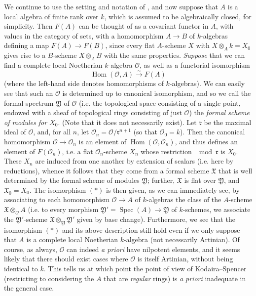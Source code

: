 We continue to use the setting and notation of , and now suppose that $A$ is a local algebra of finite rank over $k$, which is assumed to be algebraically closed, for simplicity.
Then $F(A)$ can be thought of as a covariant functor in $A$, with values in the category of sets, with a homomorphism $A\to B$ of $k$-algebras defining a map $F(A)\to F(B)$, since every flat $A$-scheme $X$ with $X\otimes_Ak=X_0$ gives rise to a $B$-scheme $X\otimes_AB$ with the same properties.
\emph{Suppose} that we can find a complete local Noetherian $k$-algebra $\mathcal{O}$, as well as a functorial isomorphism
\[
    \operatorname{Hom}(\mathcal{O},A) \xrightarrow{\sim} F(A)\tag{*}
\]
(where the left-hand side denotes homomorphisms of $k$-algebras).
We can easily see that such an $\mathcal{O}$ is determined up to canonical isomorphism, and so we call the formal spectrum $\mathfrak{Y}$ of $\mathcal{O}$ (i.e. the topological space consisting of a single point, endowed with a sheaf of topological rings consisting of just $\mathcal{O}$) the \emph{formal scheme of modules for $X_0$}.
(Note that it does not necessarily exist).
Let $\mathfrak{r}$ be the maximal ideal of $\mathcal{O}$, and, for all $n$, let $\mathcal{O}_n=\mathcal{O} /\mathfrak{r}^{n+1}$ (so that $\mathcal{O}_0=k$).
Then the canonical homomorphism $\mathcal{O}\to\mathcal{O}_n$ is an element of $\operatorname{Hom}(\mathcal{O},\mathcal{O}_n)$, and thus defines an element of $F(\mathcal{O}_n)$, i.e. a flat $\mathcal{O}_n$-scheme $X_n$ whose restriction $\mod\mathfrak{r}$ is $X_0$.
These $X_n$ are induced from one another by extension of scalars (i.e. here by reductions), whence it follows that they come from a formal scheme $\mathfrak{X}$ that is well determined by the formal scheme of modules $\mathfrak{Y}$;
further, $\mathfrak{X}$ is flat over $\mathfrak{Y}$, and $\mathfrak{X}_0=X_0$.
The isomorphism $(*)$ is then given, as we can immediately see, by associating to each homomorphism $\mathcal{O}\to A$ of $k$-algebras the class of the $A$-scheme $\mathfrak{X}\otimes_{\mathcal{O}} A$ (i.e. to every morphism $\mathfrak{Y}'=\operatorname{Spec}(A)\to\mathfrak{Y}$ of $k$-schemes, we associate the $\mathfrak{Y}'$-scheme $\mathfrak{X}\otimes_{\mathfrak{Y}}\mathfrak{Y}'$ given by base change).
Furthermore, we see that the isomorphism $(*)$ and its above description still hold even if we only suppose that $A$ is a complete local Noetherian $k$-algebra (not necessarily Artinian).
Of course, as always, $\mathcal{O}$ can indeed \emph{a priori} have nilpotent elements, and it seems likely that there should exist cases where $\mathcal{O}$ is itself Artinian, without being identical to $k$.
This tells us at which point the point of view of Kodaira–Spencer (restricting to considering the $A$ that are \emph{regular} rings) is \emph{a priori} inadequate in the general case.

